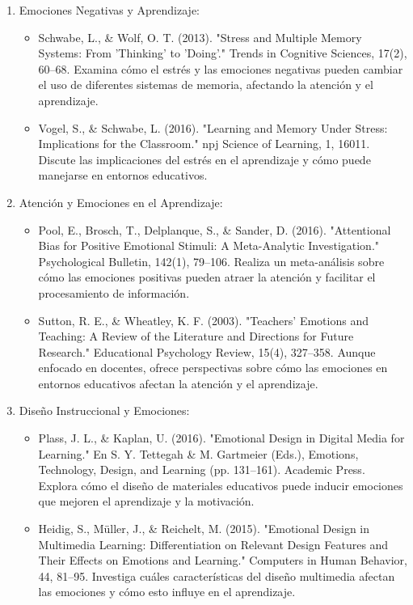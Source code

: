 \documentclass{article}
\begin{document}
\begin{enumerate}
\begin{itemize}
    \end{itemize}
    \item Emociones Negativas y Aprendizaje:
    \begin{itemize}
        \item Schwabe, L., \& Wolf, O. T. (2013). "Stress and Multiple Memory Systems: From 'Thinking' to 'Doing'." Trends in Cognitive Sciences, 17(2), 60–68. Examina cómo el estrés y las emociones negativas pueden cambiar el uso de diferentes sistemas de memoria, afectando la atención y el aprendizaje.
        \item Vogel, S., \& Schwabe, L. (2016). "Learning and Memory Under Stress: Implications for the Classroom." npj Science of Learning, 1, 16011. Discute las implicaciones del estrés en el aprendizaje y cómo puede manejarse en entornos educativos.
    \end{itemize}
    \item Atención y Emociones en el Aprendizaje:
    \begin{itemize}
        \item Pool, E., Brosch, T., Delplanque, S., \& Sander, D. (2016). "Attentional Bias for Positive Emotional Stimuli: A Meta-Analytic Investigation." Psychological Bulletin, 142(1), 79–106. Realiza un meta-análisis sobre cómo las emociones positivas pueden atraer la atención y facilitar el procesamiento de información.
        \item Sutton, R. E., \& Wheatley, K. F. (2003). "Teachers' Emotions and Teaching: A Review of the Literature and Directions for Future Research." Educational Psychology Review, 15(4), 327–358. Aunque enfocado en docentes, ofrece perspectivas sobre cómo las emociones en entornos educativos afectan la atención y el aprendizaje.
    \end{itemize}
    \item Diseño Instruccional y Emociones:
    \begin{itemize}
        \item Plass, J. L., \& Kaplan, U. (2016). "Emotional Design in Digital Media for Learning." En S. Y. Tettegah \& M. Gartmeier (Eds.), Emotions, Technology, Design, and Learning (pp. 131–161). Academic Press. Explora cómo el diseño de materiales educativos puede inducir emociones que mejoren el aprendizaje y la motivación.
        \item Heidig, S., Müller, J., \& Reichelt, M. (2015). "Emotional Design in Multimedia Learning: Differentiation on Relevant Design Features and Their Effects on Emotions and Learning." Computers in Human Behavior, 44, 81–95. Investiga cuáles características del diseño multimedia afectan las emociones y cómo esto influye en el aprendizaje.

\end{itemize}
\end{enumerate}
\end{document}
